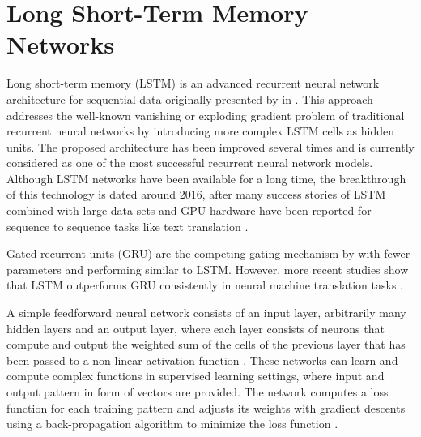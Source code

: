 \section{Long Short-Term Memory Networks}

Long short-term memory (LSTM) is an advanced recurrent neural network architecture for sequential data originally presented by \citeauthor{DBLP:journals/neco/HochreiterS97} in \citeyear{DBLP:journals/neco/HochreiterS97} \cite{DBLP:journals/neco/HochreiterS97}.
This approach addresses the well-known vanishing or exploding gradient problem \cite{DBLP:conf/icml/PascanuMB13}  of traditional recurrent neural networks by introducing more complex LSTM cells as hidden units.
The proposed architecture has been improved several times \cite{DBLP:journals/neco/GersSC00} \cite {DBLP:journals/tnn/GreffSKSS17} and is currently considered as one of the most successful recurrent neural network models.
Although LSTM networks have been available for a long time, the breakthrough of this technology is dated around 2016, after many success stories of LSTM combined with large data sets and GPU hardware have been reported for sequence to sequence tasks like text translation \cite{DBLP:journals/corr/WuSCLNMKCGMKSJL16}.

Gated recurrent units (GRU) \cite{DBLP:conf/emnlp/ChoMGBBSB14} are the competing gating mechanism by \citeauthor{DBLP:conf/emnlp/ChoMGBBSB14} with fewer parameters and performing similar to LSTM.
However, more recent studies show that LSTM outperforms GRU consistently in neural machine translation tasks \cite{DBLP:journals/corr/BritzGLL17}.

A simple feedforward neural network consists of an input layer, arbitrarily many hidden layers and an output layer, where each layer consists of neurons that compute and output the weighted sum of the cells of the previous layer that has been passed to a non-linear activation function \cite{DBLP:journals/nn/Schmidhuber15}.
These networks can learn and compute complex functions in supervised learning settings, where input and output pattern in form of vectors are provided.
The network computes a loss function for each training pattern and adjusts its weights with gradient descents using a back-propagation algorithm to minimize the loss function \cite{rumelhart1986learning}.

